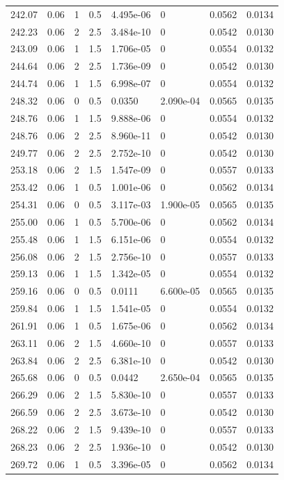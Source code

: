 \documentclass[preview]{standalone}
\begin{document}
{{{{{\begin{tabular}{L{1.2cm}C{1.2cm} C{0.3cm}C{0.5cm} C{1.4cm}C{1.4cm} C{1.4cm}C{1.4cm}}
  242.07  &  0.06  & 1     & 0.5 &  4.495e-06  & 0  & 0.0562 &  0.0134   \\ 
  242.23  &  0.06  & 2     & 2.5 &  3.484e-10  & 0  & 0.0542 &  0.0130   \\ 
  243.09  &  0.06  & 1     & 1.5 &  1.706e-05  & 0  & 0.0554 &  0.0132   \\ 
  244.64  &  0.06  & 2     & 2.5 &  1.736e-09  & 0  & 0.0542 &  0.0130   \\ 
  244.74  &  0.06  & 1     & 1.5 &  6.998e-07  & 0  & 0.0554 &  0.0132   \\ 
  248.32  &  0.06  & 0     & 0.5 &  0.0350  & 2.090e-04  & 0.0565 &  0.0135   \\ 
  248.76  &  0.06  & 1     & 1.5 &  9.888e-06  & 0  & 0.0554 &  0.0132   \\ 
  248.76  &  0.06  & 2     & 2.5 &  8.960e-11  & 0  & 0.0542 &  0.0130   \\ 
  249.77  &  0.06  & 2     & 2.5 &  2.752e-10  & 0  & 0.0542 &  0.0130   \\ 
  253.18  &  0.06  & 2     & 1.5 &  1.547e-09  & 0  & 0.0557 &  0.0133   \\ 
  253.42  &  0.06  & 1     & 0.5 &  1.001e-06  & 0  & 0.0562 &  0.0134   \\ 
  254.31  &  0.06  & 0     & 0.5 &  3.117e-03  & 1.900e-05  & 0.0565 &  0.0135   \\ 
  255.00  &  0.06  & 1     & 0.5 &  5.700e-06  & 0  & 0.0562 &  0.0134   \\ 
  255.48  &  0.06  & 1     & 1.5 &  6.151e-06  & 0  & 0.0554 &  0.0132   \\ 
  256.08  &  0.06  & 2     & 1.5 &  2.756e-10  & 0  & 0.0557 &  0.0133   \\ 
  259.13  &  0.06  & 1     & 1.5 &  1.342e-05  & 0  & 0.0554 &  0.0132   \\ 
  259.16  &  0.06  & 0     & 0.5 &  0.0111  & 6.600e-05  & 0.0565 &  0.0135   \\ 
  259.84  &  0.06  & 1     & 1.5 &  1.541e-05  & 0  & 0.0554 &  0.0132   \\ 
  261.91  &  0.06  & 1     & 0.5 &  1.675e-06  & 0  & 0.0562 &  0.0134   \\ 
  263.11  &  0.06  & 2     & 1.5 &  4.660e-10  & 0  & 0.0557 &  0.0133   \\ 
  263.84  &  0.06  & 2     & 2.5 &  6.381e-10  & 0  & 0.0542 &  0.0130   \\ 
  265.68  &  0.06  & 0     & 0.5 &  0.0442  & 2.650e-04  & 0.0565 &  0.0135   \\ 
  266.29  &  0.06  & 2     & 1.5 &  5.830e-10  & 0  & 0.0557 &  0.0133   \\ 
  266.59  &  0.06  & 2     & 2.5 &  3.673e-10  & 0  & 0.0542 &  0.0130   \\ 
  268.22  &  0.06  & 2     & 1.5 &  9.439e-10  & 0  & 0.0557 &  0.0133   \\ 
  268.23  &  0.06  & 2     & 2.5 &  1.936e-10  & 0  & 0.0542 &  0.0130   \\ 
  269.72  &  0.06  & 1     & 0.5 &  3.396e-05  & 0  & 0.0562 &  0.0134   \\ 
\hline 
\end{tabular} 

}}}}}
\end{document}
